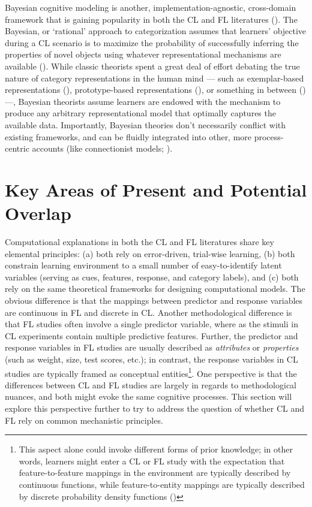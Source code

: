 \documentclass[12pt]{article}
\let\oldcite=\cite
\renewcommand{\cite}[1]{\textcolor[rgb]{0, .121, .388}{\oldcite{#1}}}
\begin{document}
Bayesian cognitive modeling is another, implementation-agnostic, cross-domain framework that is gaining popularity in both the CL and FL literatures (\cite{anderson1991adaptive,sanborn2006more,griffiths2008categorization}). The Bayesian, or `rational' approach to categorization assumes that learners' objective during a CL scenario is to maximize the probability of successfully inferring the properties of novel objects using whatever representational mechanisms are available (\cite{griffiths2008categorization}). While classic theorists spent a great deal of effort debating the true nature of category representations in the human mind --- such as exemplar-based representations (\cite{nosofsky1986attention}), prototype-based representations (\cite{minda2001prototypes}), or something in between (\cite{love2004sustain,rosseel2002mixture,vanpaemel2005varying}) ---, Bayesian theorists assume learners are endowed with the mechanism to produce any arbitrary representational model that optimally captures the available data. Importantly, Bayesian theories don't necessarily conflict with existing frameworks, and can be fluidly integrated into other, more process-centric accounts (like connectionist models; \cite{neal2012bayesian}).


\section{Key Areas of Present and Potential Overlap}

Computational explanations in both the CL and FL literatures share key elemental principles: (a) both rely on error-driven, trial-wise learning, (b) both constrain learning environment to a small number of easy-to-identify latent variables (serving as cues, features, response, and category labels), and (c) both rely on the same theoretical frameworks for designing computational models. The obvious difference is that the mappings between predictor and response variables are continuous in FL and discrete in CL. Another methodological difference is that FL studies often involve a single predictor variable, where as the stimuli in CL experiments contain multiple predictive features. Further, the predictor and response variables in FL studies are usually described as \emph{attributes} or \emph{properties} (such as weight, size, test scores, etc.); in contrast, the response variables in CL studies are typically framed as conceptual entities\footnote{This aspect alone could invoke different forms of prior knowledge; in other words, learners might enter a CL or FL study with the expectation that feature-to-feature mappings in the environment are typically described by continuous functions, while feature-to-entity mappings are typically described by discrete probability density functions (\cite{ashby1995categorization})}. One perspective is that the differences between CL and FL studies are largely in regards to methodological nuances, and both might evoke the same cognitive processes. This section will explore this perspective further to try to address the question of whether CL and FL rely on common mechanistic principles.
\end{document}

